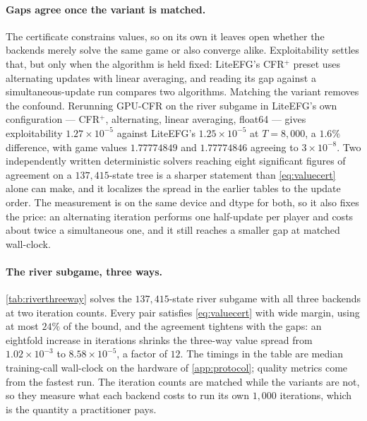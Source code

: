 \paragraph{Gaps agree once the variant is matched.}
The certificate constrains values, so on its own it leaves open whether the backends
merely solve the same game or also converge alike. Exploitability settles that, but only
when the algorithm is held fixed: LiteEFG's CFR$^{+}$ preset uses alternating updates
with linear averaging, and reading its gap against a simultaneous-update run compares
two algorithms. Matching the variant removes the
confound. Rerunning GPU-CFR on the river subgame in LiteEFG's own configuration
--- CFR$^{+}$, alternating, linear averaging, float64 --- gives exploitability
$1.27 \times 10^{-5}$ against LiteEFG's $1.25 \times 10^{-5}$ at $T = 8{,}000$, a
$1.6\%$ difference, with game values $1.77774849$ and $1.77774846$ agreeing to
$3 \times 10^{-8}$. Two independently written deterministic solvers reaching eight
significant figures of agreement on a $137{,}415$-state tree is a sharper statement than
\cref{eq:valuecert} alone can make, and it localizes the spread in the earlier tables to
the update order. The measurement is on the same
device and dtype for both, so it also fixes the price: an alternating iteration performs
one half-update per player and costs about twice a simultaneous one, and it still reaches
a smaller gap at matched wall-clock.

\paragraph{The river subgame, three ways.}
\cref{tab:riverthreeway} solves the $137{,}415$-state river subgame with all three
backends at two iteration counts. Every pair satisfies \cref{eq:valuecert} with wide
margin, using at most $24\%$ of the bound, and the agreement tightens with the gaps: an
eightfold increase in iterations shrinks the three-way value spread from
$1.02 \times 10^{-3}$ to $8.58 \times 10^{-5}$, a factor of $12$. The timings in the
table are median training-call wall-clock on the hardware of \cref{app:protocol};
quality metrics come from the fastest run. The
iteration counts are matched while the variants are not, so they measure what each
backend costs to run its own $1{,}000$ iterations, which is the quantity a
practitioner pays.



